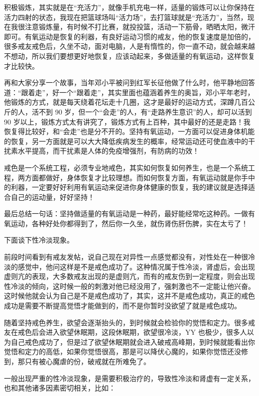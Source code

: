\documentclass[fontset=founder]{ctexart}
\begin{document}
积极锻炼，其实就是在“充活力”，就像手机充电一样，适量的锻炼可以让你保持在活力四射的状态，我现在把篮球场叫“活力场”，去打篮球就是“充活力”，当然，现在我很注意锻炼量，有时候不打比赛，就投投篮，活动一下筋骨，晒晒太阳，微汗即可。有氧运动是恢复的利器，有良好运动习惯的戒友，他的恢复速度是加倍的，很多戒友戒色后，久坐不动，面对电脑，人是有惰性的，你一直不动，就会越来越不想动，所以我们要想更好地恢复，应该动起来，多做适量的有氧运动，这样恢复才比较快。

再和大家分享一个故事，当年邓小平被问到红军长征他做了什么时，他平静地回答道：“跟着走”，好一个“跟着走”，其实里面也蕴涵着养生的奥旨，邓小平年老时，他锻炼的方式，就是每天绕着花坛走十几圈，这才是最好的运动方式，深蹲几百公斤的人，活不到 90 岁，但一个“会走”的人，有“走路养生意识”的人，却可以活到 90 岁以上，锻炼方式太有讲究了，锻炼方式有上百种，其中最好的还是走路！我恢复得比较好，和“会走”也是分不开的。坚持有氧运动，一方面可以促进身体机能的恢复，另一方面就是可以大大降低疾病发生的概率，经常运动还可使血液中的干扰素水平提高，而干扰素是人体的免疫增强剂，有防病的功效！

戒色是一个系统工程，必须专业地戒色，其实如何恢复如何养生，也是一个系统工程，两方面都做好，身体恢复才比较理想。而如何恢复方面，有氧运动就是你手中的利器，一定要好好利用有氧运动来促进你身体健康的恢复，我的建议就是选择适合自己的运动量，好好坚持！

最后总结一句话：坚持做适量的有氧运动是一种药，最好能经常吃这种药。一做有氧运动，各种好处你都得到了，然后你一久坐，就伤肾伤肝伤脾，实在太亏了！

下面谈下性冷淡现象。

前段时间看到有戒友发帖，说自己现在对异性一点感觉都没有，对性处在一种很冷淡的感觉中，他问这样是不是戒色成功了。这种情况属于性冷淡，肾虚后，会出现虚则亢的表现，大多数戒友出现的是虚则亢，而有的戒友伤到一定程度，则会出现性冷淡的倾向，这时候一般的刺激对他已经没用了，强刺激也不一定能让他兴奋。这时候他就会认为自己是不是戒色成功了，其实，这并不是戒色成功，真正的戒色成功是需要不断提高觉悟才能做到的，而不是你暂时没欲望了就是戒色成功。

随着坚持戒色养生，欲望会逐渐抬头的，到时候就会检验你的觉悟和定力。很多戒友在戒色后会进入欲望休眠期，这段休眠期，欲望很冷淡，YY 也极少，很多人以为自己戒色成功了，但是过了欲望休眠期就会进入破戒高峰期，到时候就能看出你觉悟和定力的高低，如果你觉悟很高，那是可以降伏心魔的，如果你觉悟还没修到，那只有被心魔虐的份，破戒就在所难免了。

一般出现严重的性冷淡现象，是需要积极治疗的，导致性冷淡和肾虚有一定关系，也和其他诸多因素密切相关，比如：
\end{document}
